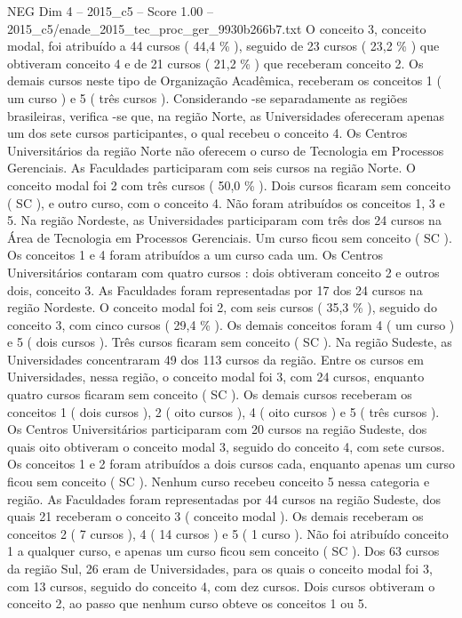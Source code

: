 \begin{textsample}{NEG Dim 4 – 2015\_c5 – Score 1.00 – 2015\_c5/enade\_2015\_tec\_proc\_ger\_9930b266b7.txt}
O conceito 3, conceito modal, foi atribuído a 44 cursos ( 44,4 \% ), seguido de 23 cursos ( 23,2 \% ) que obtiveram conceito 4 e de 21 cursos ( 21,2 \% ) que receberam conceito 2.
Os demais cursos neste tipo de Organização Acadêmica, receberam os conceitos 1 ( um curso ) e 5 ( três cursos ).
Considerando -se separadamente as regiões brasileiras, verifica -se que, na região Norte, as Universidades ofereceram apenas um dos sete cursos participantes, o qual recebeu o conceito 4.
Os Centros Universitários da região Norte não oferecem o curso de Tecnologia em Processos Gerenciais.
As Faculdades participaram com seis cursos na região Norte.
O conceito modal foi 2 com três cursos ( 50,0 \% ).
Dois cursos ficaram sem conceito ( SC ), e outro curso, com o conceito 4.
Não foram atribuídos os conceitos 1, 3 e 5.
Na região Nordeste, as Universidades participaram com três dos 24 cursos na Área de Tecnologia em Processos Gerenciais.
Um curso ficou sem conceito ( SC ).
Os conceitos 1 e 4 foram atribuídos a um curso cada um.
Os Centros Universitários contaram com quatro cursos : dois obtiveram conceito 2 e outros dois, conceito 3.
As Faculdades foram representadas por 17 dos 24 cursos na região Nordeste.
O conceito modal foi 2, com seis cursos ( 35,3 \% ), seguido do conceito 3, com cinco cursos ( 29,4 \% ).
Os demais conceitos foram 4 ( um curso ) e 5 ( dois cursos ).
Três cursos ficaram sem conceito ( SC ).
Na região Sudeste, as Universidades concentraram 49 dos 113 cursos da região.
Entre os cursos em Universidades, nessa região, o conceito modal foi 3, com 24 cursos, enquanto quatro cursos ficaram sem conceito ( SC ).
Os demais cursos receberam os conceitos 1 ( dois cursos ), 2 ( oito cursos ), 4 ( oito cursos ) e 5 ( três cursos ).
Os Centros Universitários participaram com 20 cursos na região Sudeste, dos quais oito obtiveram o conceito modal 3, seguido do conceito 4, com sete cursos.
Os conceitos 1 e 2 foram atribuídos a dois cursos cada, enquanto apenas um curso ficou sem conceito ( SC ).
Nenhum curso recebeu conceito 5 nessa categoria e região.
As Faculdades foram representadas por 44 cursos na região Sudeste, dos quais 21 receberam o conceito 3 ( conceito modal ).
Os demais receberam os conceitos 2 ( 7 cursos ), 4 ( 14 cursos ) e 5 ( 1 curso ).
Não foi atribuído conceito 1 a qualquer curso, e apenas um curso ficou sem conceito ( SC ).
Dos 63 cursos da região Sul, 26 eram de Universidades, para os quais o conceito modal foi 3, com 13 cursos, seguido do conceito 4, com dez cursos.
Dois cursos obtiveram o conceito 2, ao passo que nenhum curso obteve os conceitos 1 ou 5.

\end{textsample}
